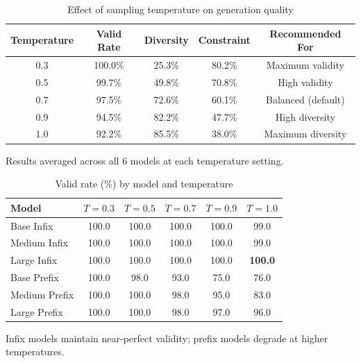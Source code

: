 \begin{table}[htbp]
\centering
\caption{Effect of sampling temperature on generation quality}
\label{tab:temperature_sweep}
\begin{tabular}{@{}ccccc@{}}
\toprule
\textbf{Temperature} & \textbf{Valid Rate} & \textbf{Diversity} & \textbf{Constraint} & \textbf{Recommended For} \\
\midrule
0.3 & 100.0\% & 25.3\% & 80.2\% & Maximum validity \\
0.5 & 99.7\% & 49.8\% & 70.8\% & High validity \\
0.7 & 97.5\% & 72.6\% & 60.1\% & Balanced (default) \\
0.9 & 94.5\% & 82.2\% & 47.7\% & High diversity \\
1.0 & 92.2\% & 85.5\% & 38.0\% & Maximum diversity \\
\bottomrule
\end{tabular}
\begin{tablenotes}
\small
\item Results averaged across all 6 models at each temperature setting.
\end{tablenotes}
\end{table}

\begin{table}[htbp]
\centering
\caption{Valid rate (\%) by model and temperature}
\label{tab:temp_detailed}
\begin{tabular}{@{}lccccc@{}}
\toprule
\textbf{Model} & $T=0.3$ & $T=0.5$ & $T=0.7$ & $T=0.9$ & $T=1.0$ \\
\midrule
Base Infix & 100.0 & 100.0 & 100.0 & 100.0 & 99.0 \\
Medium Infix & 100.0 & 100.0 & 100.0 & 100.0 & 99.0 \\
Large Infix & 100.0 & 100.0 & 100.0 & 100.0 & \textbf{100.0} \\
\midrule
Base Prefix & 100.0 & 98.0 & 93.0 & 75.0 & 76.0 \\
Medium Prefix & 100.0 & 100.0 & 98.0 & 95.0 & 83.0 \\
Large Prefix & 100.0 & 100.0 & 98.0 & 97.0 & 96.0 \\
\bottomrule
\end{tabular}
\begin{tablenotes}
\small
\item Infix models maintain near-perfect validity; prefix models degrade at higher temperatures.
\end{tablenotes}
\end{table}

